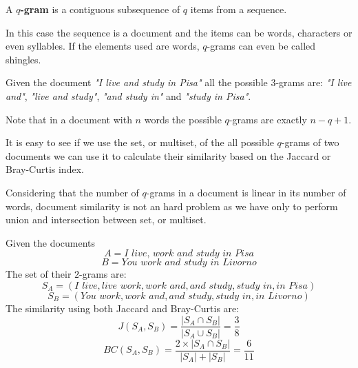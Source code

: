 \begin{definizione}
	A \textbf{$q$-gram} is a contiguous subsequence of $q$ items from a sequence.
\end{definizione}

In this case the sequence is a document and the items can be words, characters or even syllables. If the elements used are words, $q$-grams can even be called shingles.\medskip

\begin{esempio}
	Given the document \textit{"I live and study in Pisa"} all the possible $3$-grams are: 
	\textit{"I live and"}, \textit{"live and study"}, \textit{"and study in"} and \textit{"study in Pisa"}.
\end{esempio}

Note that in a document with $n$ words the possible $q$-grams are exactly $n-q+1$.\medskip

It is easy to see if we use the set, or multiset, of the all possible $q$-grams of two documents we can use it to calculate their similarity based on the Jaccard or Bray-Curtis index.\medskip

Considering that the number of $q$-grams in a document is linear in its number of words, document similarity is not an hard problem as we have only to perform union and intersection between set, or multiset.\medskip

\begin{esempio}
	Given the documents 
	\begin{equation*}
	A = \textit{I live, work and study in Pisa}
	\end{equation*}
	\begin{equation*}
	B = \textit{You work and study in Livorno}
	\end{equation*}
	The set of their $2$-grams are:
	\begin{equation*}
	S_{A} = (\textit{I live}, \textit{live work}, \textit{work and}, \textit{and study}, \textit{study in}, \textit{in Pisa})
	\end{equation*}
	\begin{equation*}
	S_{B} = (\textit{You work}, \textit{work and}, \textit{and study}, \textit{study in}, \textit{in Livorno})
	\end{equation*}
	The similarity using both Jaccard and Bray-Curtis are:\medskip
	\begin{equation*}
	J(S_{A},S_{B}) = \frac{|S_{A} \cap S_{B} |}{|S_{A} \cup S_{B} |} = \frac{3}{8}
	\end{equation*}
	\begin{equation*}
	BC(S_{A},S_{B}) = \frac{2 \times |S_{A} \cap S_{B} |}{|S_{A}| +|S_{B}|} = \frac{6}{11}
	\end{equation*}
\end{esempio}

